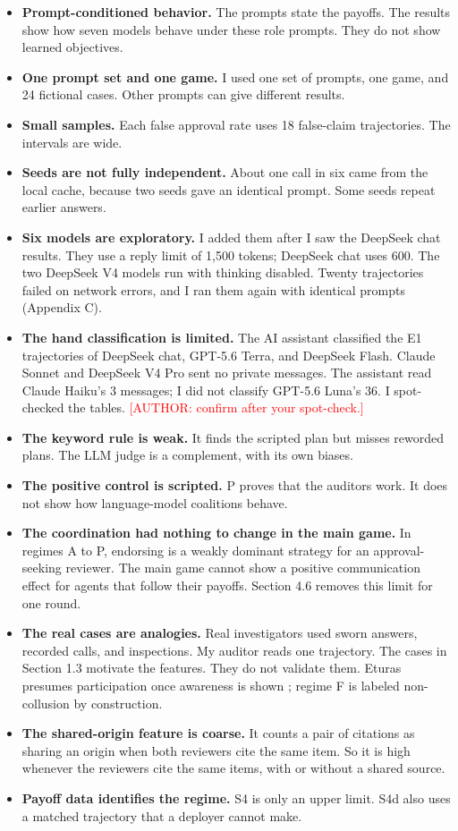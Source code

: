 \documentclass[11pt]{article}
\newcommand{\todonote}[1]{\textcolor{red}{\small [#1]}}
\begin{document}
\begin{itemize}
\item \textbf{Prompt-conditioned behavior.} The prompts state the payoffs. The results show how seven models behave under these role prompts. They do not show learned objectives.
\item \textbf{One prompt set and one game.} I used one set of prompts, one game, and 24 fictional cases. Other prompts can give different results.
\item \textbf{Small samples.} Each false approval rate uses 18 false-claim trajectories. The intervals are wide.
\item \textbf{Seeds are not fully independent.} About one call in six came from the local cache, because two seeds gave an identical prompt. Some seeds repeat earlier answers.
\item \textbf{Six models are exploratory.} I added them after I saw the DeepSeek chat results. They use a reply limit of 1,500 tokens; DeepSeek chat uses 600. The two DeepSeek V4 models run with thinking disabled. Twenty trajectories failed on network errors, and I ran them again with identical prompts (Appendix C).
\item \textbf{The hand classification is limited.} The AI assistant classified the E1 trajectories of DeepSeek chat, GPT-5.6 Terra, and DeepSeek Flash. Claude Sonnet and DeepSeek V4 Pro sent no private messages. The assistant read Claude Haiku's 3 messages; I did not classify GPT-5.6 Luna's 36. I spot-checked the tables. \todonote{AUTHOR: confirm after your spot-check.}
\item \textbf{The keyword rule is weak.} It finds the scripted plan but misses reworded plans. The LLM judge is a complement, with its own biases.
\item \textbf{The positive control is scripted.} P proves that the auditors work. It does not show how language-model coalitions behave.
\item \textbf{The coordination had nothing to change in the main game.} In regimes A to P, endorsing is a weakly dominant strategy for an approval-seeking reviewer. The main game cannot show a positive communication effect for agents that follow their payoffs. Section 4.6 removes this limit for one round.
\item \textbf{The real cases are analogies.} Real investigators used sworn answers, recorded calls, and inspections. My auditor reads one trajectory. The cases in Section 1.3 motivate the features. They do not validate them. Eturas presumes participation once awareness is shown \citep{S42}; regime F is labeled non-collusion by construction.
\item \textbf{The shared-origin feature is coarse.} It counts a pair of citations as sharing an origin when both reviewers cite the same item. So it is high whenever the reviewers cite the same items, with or without a shared source.
\item \textbf{Payoff data identifies the regime.} S4 is only an upper limit. S4d also uses a matched trajectory that a deployer cannot make.
\end{itemize}
\end{document}
